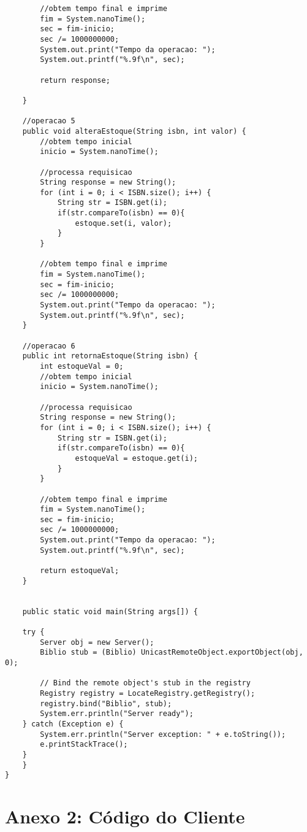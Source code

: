 \documentclass[11pt, brazil]{article} %
\begin{document}
\begin{verbatim}
        //obtem tempo final e imprime 
    	fim = System.nanoTime();
        sec = fim-inicio;
        sec /= 1000000000;
        System.out.print("Tempo da operacao: ");
        System.out.printf("%.9f\n", sec);

        return response;
		
    }

    //operacao 5
    public void alteraEstoque(String isbn, int valor) {
    	//obtem tempo inicial
    	inicio = System.nanoTime();

    	//processa requisicao
    	String response = new String();
        for (int i = 0; i < ISBN.size(); i++) {
            String str = ISBN.get(i);
            if(str.compareTo(isbn) == 0){
                estoque.set(i, valor);
            }
        }

        //obtem tempo final e imprime 
    	fim = System.nanoTime();
        sec = fim-inicio;
        sec /= 1000000000;
        System.out.print("Tempo da operacao: ");
        System.out.printf("%.9f\n", sec);
    }

    //operacao 6
    public int retornaEstoque(String isbn) {
        int estoqueVal = 0;
    	//obtem tempo inicial
    	inicio = System.nanoTime();

    	//processa requisicao
    	String response = new String();
        for (int i = 0; i < ISBN.size(); i++) {
            String str = ISBN.get(i);
            if(str.compareTo(isbn) == 0){
                estoqueVal = estoque.get(i);
            }
        }

        //obtem tempo final e imprime 
    	fim = System.nanoTime();
        sec = fim-inicio;
        sec /= 1000000000;
        System.out.print("Tempo da operacao: ");
        System.out.printf("%.9f\n", sec);
		
        return estoqueVal;
    }

	
    public static void main(String args[]) {
	
	try {
	    Server obj = new Server();
	    Biblio stub = (Biblio) UnicastRemoteObject.exportObject(obj, 0);

	    // Bind the remote object's stub in the registry
	    Registry registry = LocateRegistry.getRegistry();
	    registry.bind("Biblio", stub);
	    System.err.println("Server ready");
	} catch (Exception e) {
	    System.err.println("Server exception: " + e.toString());
	    e.printStackTrace();
	}
    }
}
\end{verbatim}


\section*{Anexo 2: Código do Cliente}
\end{document}
